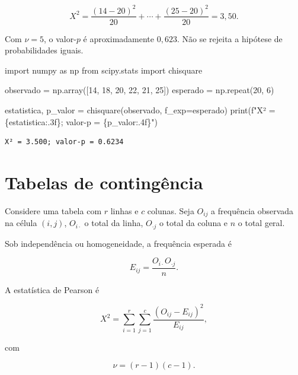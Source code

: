 \documentclass[
  letterpaper,
  DIV=11,
  numbers=noendperiod]{scrreprt}
\newenvironment{Shaded}{\begin{snugshade}}{\end{snugshade}}
\newcommand{\BuiltInTok}[1]{\textcolor[rgb]{0.00,0.23,0.31}{#1}}
\newcommand{\DecValTok}[1]{\textcolor[rgb]{0.68,0.00,0.00}{#1}}
\newcommand{\ImportTok}[1]{\textcolor[rgb]{0.00,0.46,0.62}{#1}}
\newcommand{\NormalTok}[1]{\textcolor[rgb]{0.00,0.23,0.31}{#1}}
\newcommand{\OperatorTok}[1]{\textcolor[rgb]{0.37,0.37,0.37}{#1}}
\newcommand{\SpecialCharTok}[1]{\textcolor[rgb]{0.37,0.37,0.37}{#1}}
\newcommand{\SpecialStringTok}[1]{\textcolor[rgb]{0.13,0.47,0.30}{#1}}
\begin{document}
\[X^2
=\frac{(14-20)^2}{20}
+\cdots+
\frac{(25-20)^2}{20}
=3{,}50.\]

Com \(\nu=5\), o valor-\(p\) é aproximadamente \(0{,}623\). Não se
rejeita a hipótese de probabilidades iguais.

\begin{Shaded}
\begin{Highlighting}[]
\ImportTok{import}\NormalTok{ numpy }\ImportTok{as}\NormalTok{ np}
\ImportTok{from}\NormalTok{ scipy.stats }\ImportTok{import}\NormalTok{ chisquare}

\NormalTok{observado }\OperatorTok{=}\NormalTok{ np.array([}\DecValTok{14}\NormalTok{, }\DecValTok{18}\NormalTok{, }\DecValTok{20}\NormalTok{, }\DecValTok{22}\NormalTok{, }\DecValTok{21}\NormalTok{, }\DecValTok{25}\NormalTok{])}
\NormalTok{esperado }\OperatorTok{=}\NormalTok{ np.repeat(}\DecValTok{20}\NormalTok{, }\DecValTok{6}\NormalTok{)}

\NormalTok{estatistica, p\_valor }\OperatorTok{=}\NormalTok{ chisquare(observado, f\_exp}\OperatorTok{=}\NormalTok{esperado)}
\BuiltInTok{print}\NormalTok{(}\SpecialStringTok{f"X² = }\SpecialCharTok{\{}\NormalTok{estatistica}\SpecialCharTok{:.3f\}}\SpecialStringTok{; valor{-}p = }\SpecialCharTok{\{}\NormalTok{p\_valor}\SpecialCharTok{:.4f\}}\SpecialStringTok{"}\NormalTok{)}
\end{Highlighting}
\end{Shaded}

\begin{verbatim}
X² = 3.500; valor-p = 0.6234
\end{verbatim}

\section{Tabelas de contingência}\label{tabelas-de-continguxeancia}

Considere uma tabela com \(r\) linhas e \(c\) colunas. Seja \(O_{ij}\) a
frequência observada na célula \((i,j)\), \(O_{i\cdot}\) o total da
linha, \(O_{\cdot j}\) o total da coluna e \(n\) o total geral.

Sob independência ou homogeneidade, a frequência esperada é

\[E_{ij}
=
\frac{O_{i\cdot}O_{\cdot j}}{n}.\]

A estatística de Pearson é

\[X^2
=
\sum_{i=1}^r\sum_{j=1}^c
\frac{(O_{ij}-E_{ij})^2}{E_{ij}},\]

com

\[\nu=(r-1)(c-1).\]
\end{document}
